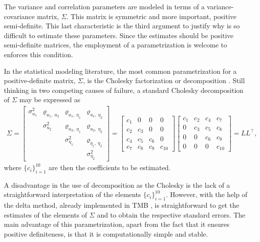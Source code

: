 The variance and correlation parameters are modeled in terms of a
variance-covariance matrix, \(\Sigma\). This matrix is symmetric and
more important, positive semi-definite. This last characteristic is the
third argument to justify why is so difficult to estimate these
parameters. Since the estimates should be positive semi-definite
matrices, the employment of a parametrization is welcome to enforces
this condition.

In the statistical modeling literature, the most common parametrization
for a positive-definite matrix, \(\Sigma\), is the Cholesky
factorization or decomposition \cite{cholesky}. Still thinking in two
competing causes of failure, a standard Cholesky decomposition of
\(\Sigma\) may be expressed as
\begin{align*}
  \Sigma =
  \begin{bmatrix}
    \sigma_{u_{1}}^{2}&
    \varrho_{u_{1},~u_{2}}&
    \varrho_{u_{1},~\eta_{1}}&\varrho_{u_{1},~\eta_{2}}\\
    &\sigma_{u_{2}}^{2}&
    \varrho_{u_{2},~\eta_{1}}&\varrho_{u_{2},~\eta_{2}}\\
    &&\sigma_{\eta_{1}}^{2}&\varrho_{\eta_{1},~\eta_{2}}\\
    &&&\sigma_{\eta_{2}}^{2}
  \end{bmatrix} =
        \begin{bmatrix}
          c_{1}&0&0&0\\
          c_{2}&c_{3}&0&0\\
          c_{4}&c_{5}&c_{6}&0\\
          c_{7}&c_{8}&c_{9}&c_{10}
        \end{bmatrix}\begin{bmatrix}
          c_{1}&c_{2}&c_{4}&c_{7}\\
          0&c_{3}&c_{5}&c_{8}\\
          0&0&c_{6}&c_{9}\\
          0&0&0&c_{10}
        \end{bmatrix} = LL^{\top},
\end{align*}
where \(\{c_{i}\}_{i=1}^{10}\) are then the coefficients to be
estimated.

A disadvantage in the use of decomposition as the Cholesky is the lack
of a straightforward interpretation of the elements
\(\{c_{i}\}_{i=1}^{10}\). However, with the help of the delta method,
already implemented in TMB \cite{TMB}, is straightforward to get the
estimates of the elements of \(\Sigma\) and to obtain the respective
standard errors. The main advantage of this parametrization, apart from
the fact that it ensures positive definiteness, is that it is
computationally simple and stable.

